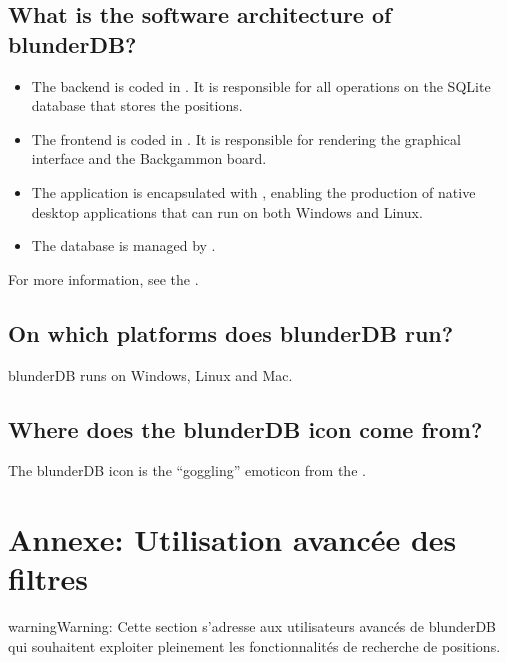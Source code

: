 \documentclass[letterpaper,10pt,english]{sphinxmanual}
\begin{document}
\subsection{What is the software architecture of blunderDB?}
\label{\detokenize{faq:quel-est-l-architecture-logicielle-de-blunderdb}}\begin{itemize}
\item {} 
\sphinxAtStartPar
The backend is coded in . It is responsible for all operations on the SQLite database that stores the positions.

\item {} 
\sphinxAtStartPar
The frontend is coded in . It is responsible for rendering the graphical interface and the Backgammon board.

\item {} 
\sphinxAtStartPar
The application is encapsulated with , enabling the production of native desktop applications that can run on both Windows and Linux.

\item {} 
\sphinxAtStartPar
The database is managed by .

\end{itemize}

\sphinxAtStartPar
For more information, see the .


\subsection{On which platforms does blunderDB run?}
\label{\detokenize{faq:sur-quelles-plateformes-blunderdb-fonctionne-t-il}}
\sphinxAtStartPar
blunderDB runs on Windows, Linux and Mac.


\subsection{Where does the blunderDB icon come from?}
\label{\detokenize{faq:d-ou-vient-l-icone-de-blunderdb}}
\sphinxAtStartPar
The blunderDB icon is the “goggling” emoticon from the  .

\sphinxstepscope


\section{Annexe: Utilisation avancée des filtres}
\label{\detokenize{annexe_filtres:annexe-utilisation-avancee-des-filtres}}\label{\detokenize{annexe_filtres:annexe-filtres}}\label{\detokenize{annexe_filtres::doc}}
\begin{sphinxadmonition}{warning}{Warning:}
\sphinxAtStartPar
Cette section s’adresse aux utilisateurs avancés de blunderDB qui souhaitent
exploiter pleinement les fonctionnalités de recherche de positions.
\end{sphinxadmonition}
\end{document}
